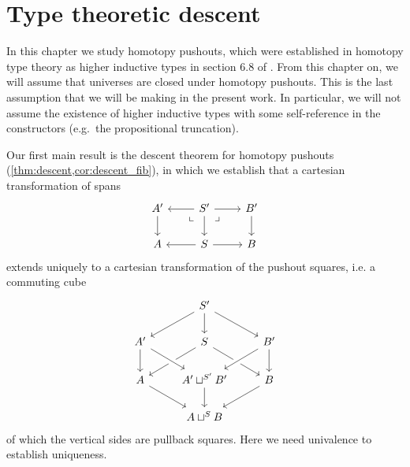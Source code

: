 \chapter{Type theoretic descent}\label{chap:descent}

In this chapter we study homotopy pushouts, which were established in homotopy type theory as higher inductive types in section 6.8 of \cite{hottbook}. From this chapter on, we will assume that universes are closed under homotopy pushouts. This is the last assumption that we will be making in the present work. In particular, we will not assume the existence of higher inductive types with some self-reference in the constructors (e.g.~the propositional truncation).

Our first main result is the descent theorem for homotopy pushouts (\cref{thm:descent,cor:descent_fib}), in which we establish that a cartesian transformation of spans
\begin{equation*}
\begin{tikzcd}
A' \arrow[d]  & S' \arrow[l] \arrow[r] \arrow[d] \arrow[dl,phantom,"\llcorner" very near start] \arrow[dr,phantom,"\lrcorner" very near start] & B' \arrow[d] \\
A & S \arrow[l] \arrow[r] & B
\end{tikzcd}
\end{equation*}
extends uniquely to a cartesian transformation of the pushout squares, i.e. a commuting cube
\begin{equation*}
\begin{tikzcd}
& S' \arrow[dl] \arrow[dr] \arrow[d] \\
A' \arrow[d] & S \arrow[dl] \arrow[dr] & B' \arrow[dl,crossing over] \arrow[d] \\
A \arrow[dr] & A'\sqcup^{S'}B' \arrow[d] \arrow[from=ul,crossing over] & B \arrow[dl] \\
& A\sqcup^S B
\end{tikzcd}
\end{equation*}
of which the vertical sides are pullback squares. Here we need univalence to establish uniqueness.

